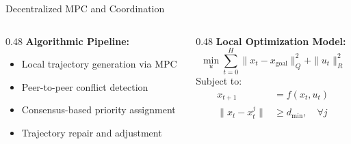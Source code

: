 \begin{frame}{Decentralized MPC and Coordination}
    \begin{columns}[T]
        \begin{column}{0.48\textwidth}
            \textbf{Algorithmic Pipeline:}
            \begin{itemize}
                \item Local trajectory generation via MPC
                \item Peer-to-peer conflict detection
                \item Consensus-based priority assignment
                \item Trajectory repair and adjustment
            \end{itemize}
        \end{column}
        \begin{column}{0.48\textwidth}
            \textbf{Local Optimization Model:}
            \begin{equation*}
                \min_{u} \sum_{t=0}^{H} \|x_t - x_{\text{goal}}\|^2_Q + \|u_t\|^2_R
            \end{equation*}
            Subject to:
            \begin{align*}
                x_{t+1} &= f(x_t, u_t) \\
                \|x_t - x^j_t\| &\ge d_{\text{min}}, \quad \forall j
            \end{align*}
        \end{column}
    \end{columns}
\end{frame}
